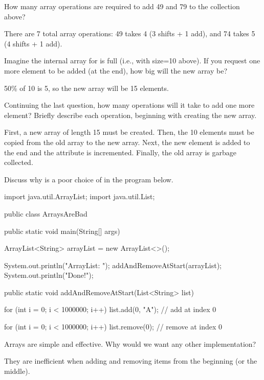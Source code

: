 \Q How many array operations are required to add 49 and 79 to the  collection above?

\begin{answer}
There are 7 total array operations:
49 takes 4 (3 shifts + 1 add), and 74 takes 5 (4 shifts + 1 add).
\end{answer}


\Q Imagine the internal array for  is full (i.e., with size=10 above).
If you request one more element to be added (at the end), how big will the new array be?

\begin{answer}
50\% of 10 is 5, so the new array will be 15 elements.
\end{answer}


\Q Continuing the last question, how many operations will it take to add one more element? Briefly describe each operation, beginning with creating the new array.

\begin{answer}[5em]
First, a new array of length 15 must be created.
Then, the 10 elements must be copied from the old array to the new array.
Next, the new element is added to the end and the  attribute is incremented.
Finally, the old array is garbage collected.
\end{answer}


\Q Discuss why  is a poor choice of  in the program below.

\begin{javabox}
import java.util.ArrayList;
import java.util.List;

public class ArraysAreBad
{
    public static void main(String[] args)
    {
        ArrayList<String> arrayList = new ArrayList<>();

        System.out.println("ArrayList: ");
        addAndRemoveAtStart(arrayList);
        System.out.println("Done!");
    }

    public static void addAndRemoveAtStart(List<String> list)
    {
        for (int i = 0; i < 1000000; i++)
        {
            list.add(0, "A");  // add at index 0
        }

        for (int i = 0; i < 1000000; i++)
        {
            list.remove(0);  // remove at index 0
        }
    }
}
\end{javabox}


\Q Arrays are simple and effective. Why would we want any other implementation?

\begin{answer}
They are inefficient when adding and removing items from the beginning (or the middle).
\end{answer}
